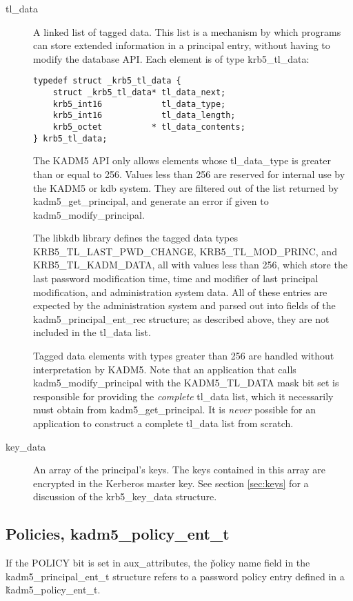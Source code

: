 \begin{description}
\item[tl_data] A linked list of tagged data.  This list is a mechanism
by which programs can store extended information in a principal entry,
without having to modify the database API.  Each element is of type
krb5_tl_data:
\begin{verbatim}
typedef struct _krb5_tl_data {
    struct _krb5_tl_data* tl_data_next;
    krb5_int16            tl_data_type;         
    krb5_int16            tl_data_length;       
    krb5_octet          * tl_data_contents;     
} krb5_tl_data;
\end{verbatim}
%
The KADM5 API only allows elements whose tl_data_type is greater than
or equal to 256.  Values less than 256 are reserved for internal use
by the KADM5 or kdb system.  They are filtered out of the list
returned by kadm5_get_principal, and generate an error if given to
kadm5_modify_principal.

The libkdb library defines the tagged data types
KRB5_TL_LAST_PWD_CHANGE, KRB5_TL_MOD_PRINC, and KRB5_TL_KADM_DATA, all
with values less than 256, which store the last password modification
time, time and modifier of last principal modification, and
administration system data.  All of these entries are expected by the
administration system and parsed out into fields of the
kadm5_principal_ent_rec structure; as described above, they are not
included in the tl_data list.

Tagged data elements with types greater than 256 are handled without
interpretation by KADM5.  Note that an application that calls
kadm5_modify_principal with the KADM5_TL_DATA mask bit set is
responsible for providing the {\it complete} tl_data list, which it
necessarily must obtain from kadm5_get_principal.  It is {\it never}
possible for an application to construct a complete tl_data list from
scratch.

\item[key_data] An array of the principal's keys.  The keys contained
in this array are encrypted in the Kerberos master key.  See section
\ref{sec:keys} for a discussion of the krb5_key_data structure.
\end{description}

\subsection{Policies, kadm5_policy_ent_t}
\label{sec:policy-fields}

If the POLICY bit is set in aux_attributes, the \v{policy} name field
in the kadm5_principal_ent_t structure refers to a password policy
entry defined in a \v{kadm5_policy_ent_t}.

